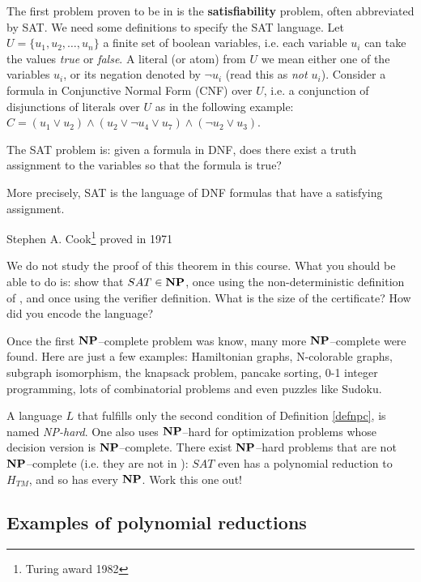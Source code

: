 The first problem proven to be in \NPC is the {\bf satisfiability}
problem, often abbreviated by SAT. We need some definitions to specify
the SAT language. Let $U = \{u_1,u_2,\ldots,u_n\}$ a finite set of
boolean variables, i.e. each variable $u_i$ can take the values {\em
true} or {\em false}.  A literal (or atom) from $U$ we mean either one
of the variables $u_i$, or its negation denoted by $\neg {u}_i$ (read
this as {\em not $u_i$}). Consider a formula in Conjunctive Normal
Form (CNF) over $U$, i.e. a conjunction of disjunctions of literals
over $U$ as in the following example:
%
$C= (u_1 \vee u_2) \wedge (u_2 \vee \neg u_4 \vee u_7) \wedge  (\neg u_2 \vee u_3)$.

The SAT problem is: given a formula in DNF, does there exist a truth
assignment to the variables so that the formula is true?

More precisely, SAT is the language of DNF formulas that have a
satisfying assignment.

Stephen A. Cook\footnote{Turing award 1982} proved in 1971




We do not study the proof of this theorem in this course. What you
should be able to do is: show that $SAT \in {\bf NP}$, once using the
non-deterministic definition of \NP, and once using the verifier
definition. What is the size of the certificate? How did you encode
the language?

Once the first ${\bf NP}$--complete problem was know, many more
${\bf NP}$--complete were found. Here are just a few examples: Hamiltonian
graphs, N-colorable graphs, subgraph isomorphism, the knapsack
problem, pancake sorting, 0-1 integer programming, lots of
combinatorial problems and even puzzles like Sudoku.

A language $L$ that fulfills only the second condition of Definition
\ref{defnpc}, is named {\em NP-hard}. One also uses ${\bf NP}$--hard for
optimization problems whose decision version is ${\bf NP}$--complete. There
exist ${\bf NP}$--hard problems that are not ${\bf NP}$--complete (i.e. they
are not in \NP): $SAT$ even has a polynomial reduction to $H_{TM}$,
and so has every ${\bf NP}$. Work this one out!


\subsection{Examples of polynomial reductions}

